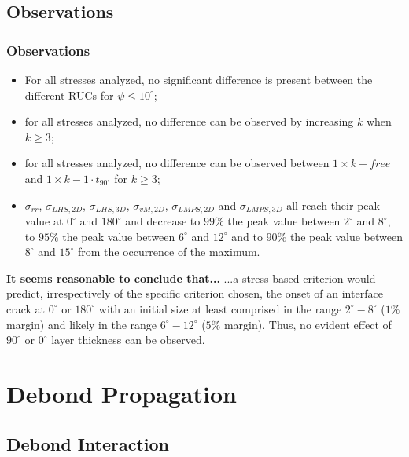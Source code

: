 \documentclass[first,firstsupp,lastsupp,last,hyperref,table]{ETHclass}
\begin{document}
\subsection{Observations}

\begin{frame}
\frametitle{Observations}
\vspace{-0.5cm}
\centering
\scriptsize
\begin{itemize}[label=]
\item For all stresses analyzed, no significant difference is present between the different RUCs for $\psi\leq10^{\circ}$;
\item for all stresses analyzed, no difference can be observed by increasing $k$ when $k\geq3$;
\item for all stresses analyzed, no difference can be observed between $1\times  k-free$ and $1\times  k-1\cdot t_{90^{\circ}}$ for $k\geq3$;
\item $\sigma_{rr}$, $\sigma_{LHS,2D}$, $\sigma_{LHS,3D}$, $\sigma_{vM,2D}$, $\sigma_{LMPS,2D}$ and $\sigma_{LMPS,3D}$ all reach their peak value at $0^{\circ}$ and $180^{\circ}$ and decrease to $99\%$ the peak value between $2^{\circ}$ and $8^{\circ}$, to $95\%$ the peak value between $6^{\circ}$ and $12^{\circ}$ and to $90\%$ the peak value between $8^{\circ}$ and $15^{\circ}$ from the occurrence of the maximum.
\end{itemize}
\begin{alertblock}{\centering\scriptsize\bf It seems reasonable to conclude that...}
...a stress-based criterion would predict, irrespectively of the specific criterion chosen, the onset of an interface crack at $0^{\circ}$ or $180^{\circ}$ with an initial size at least comprised in the range $2^{\circ}-8^{\circ}$ ($1\%$ margin) and likely in the range $6^{\circ}-12^{\circ}$ ($5\%$ margin). Thus, no evident effect of $90^{\circ}$ or $0^{\circ}$ layer thickness can be observed.
\end{alertblock}
\end{frame}

\section{Debond Propagation}

\subsection{Debond Interaction}
\end{document}
